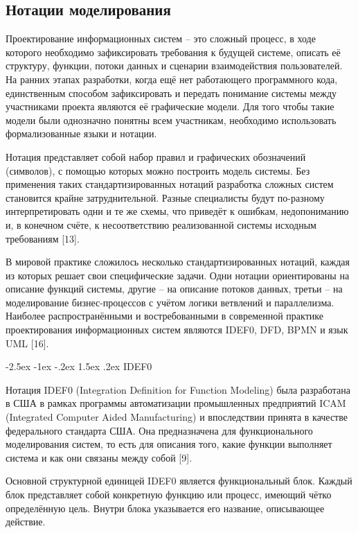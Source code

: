 \documentclass[14pt,a4paper]{extarticle}
\makeatletter
\renewcommand\subsubsection{%
  \@startsection{subsubsection}{3}{\z@}%
    {-2.5ex \@plus -1ex \@minus -.2ex}%
    {1.5ex \@plus .2ex}%
    {\centering\normalfont\normalsize\bfseries}%
}
\makeatother
\begin{document}
\subsection{Нотации моделирования}

Проектирование информационных систем -- это сложный процесс, в ходе
которого необходимо зафиксировать требования к будущей системе, описать
её структуру, функции, потоки данных и сценарии взаимодействия
пользователей. На ранних этапах разработки, когда ещё нет работающего
программного кода, единственным способом зафиксировать и передать
понимание системы между участниками проекта являются её графические
модели. Для того чтобы такие модели были однозначно понятны всем
участникам, необходимо использовать формализованные языки и нотации.

Нотация представляет собой набор правил и графических обозначений
(символов), с помощью которых можно построить модель системы. Без
применения таких стандартизированных нотаций разработка сложных систем
становится крайне затруднительной. Разные специалисты будут по-разному
интерпретировать одни и те же схемы, что приведёт к ошибкам,
недопониманию и, в конечном счёте, к несоответствию реализованной
системы исходным требованиям [13].

В мировой практике сложилось несколько стандартизированных нотаций,
каждая из которых решает свои специфические задачи. Одни нотации
ориентированы на описание функций системы, другие -- на описание потоков
данных, третьи -- на моделирование бизнес-процессов с учётом логики
ветвлений и параллелизма. Наиболее распространёнными и востребованными в
современной практике проектирования информационных систем являются
IDEF0, DFD, BPMN и язык UML [16].

\subsubsection{IDEF0}

Нотация IDEF0 (Integration Definition for Function Modeling) была
разработана в США в рамках программы автоматизации промышленных
предприятий ICAM (Integrated Computer Aided Manufacturing) и
впоследствии принята в качестве федерального стандарта США. Она
предназначена для функционального моделирования систем, то есть для
описания того, какие функции выполняет система и как они связаны между
собой [9].

Основной структурной единицей IDEF0 является функциональный блок. Каждый
блок представляет собой конкретную функцию или процесс, имеющий чётко
определённую цель. Внутри блока указывается его название, описывающее
действие.
\end{document}
